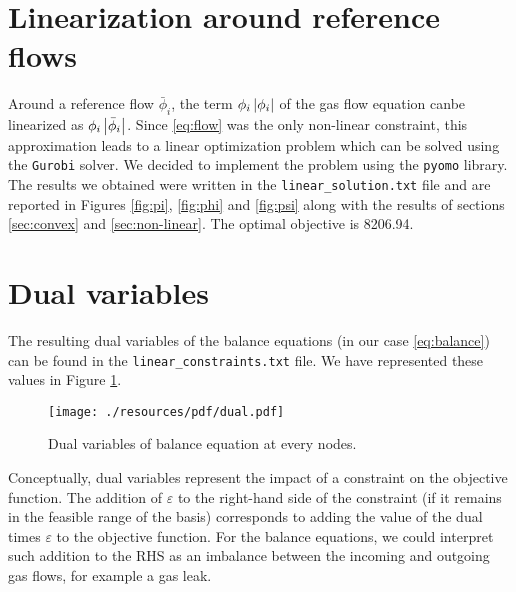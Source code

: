 \documentclass[a4paper, 12pt]{article}
\begin{document}
\section{Linearization around reference flows}

Around a reference flow $\bar{\phi}_i$, the term $\phi_i \left|\phi_i\right|$ of the gas flow equation can\footnotemark be linearized as $\phi_i \left|\bar{\phi}_i\right|$. Since \eqref{eq:flow} was the only non-linear constraint, this approximation leads to a linear optimization problem which can be solved using the \texttt{Gurobi} solver. We decided to implement the problem using the \texttt{pyomo} library. The results we obtained were written in the \texttt{linear\_solution.txt} file and are reported in Figures \ref{fig:pi}, \ref{fig:phi} and \ref{fig:psi} along with the results of sections \ref{sec:convex} and \ref{sec:non-linear}. The optimal objective is \num{8206.94}.


\section{Dual variables}

The resulting dual variables of the balance equations (in our case \eqref{eq:balance}) can be found in the \texttt{linear\_constraints.txt} file. We have represented these values in Figure \ref{fig:dual}.

\begin{figure}[h]
    \centering
    \texttt{[image: ./resources/pdf/dual.pdf]}
    \caption{Dual variables of balance equation at every nodes.}
    \label{fig:dual}
\end{figure}

Conceptually, dual variables represent the impact of a constraint on the objective function. The addition of $\varepsilon$ to the right-hand side of the constraint (if it remains in the feasible range of the basis) corresponds to adding the value of the dual times $\varepsilon$ to the objective function. For the balance equations, we could interpret such addition to the RHS as an imbalance between the incoming and outgoing gas flows, for example a gas leak.
\end{document}
